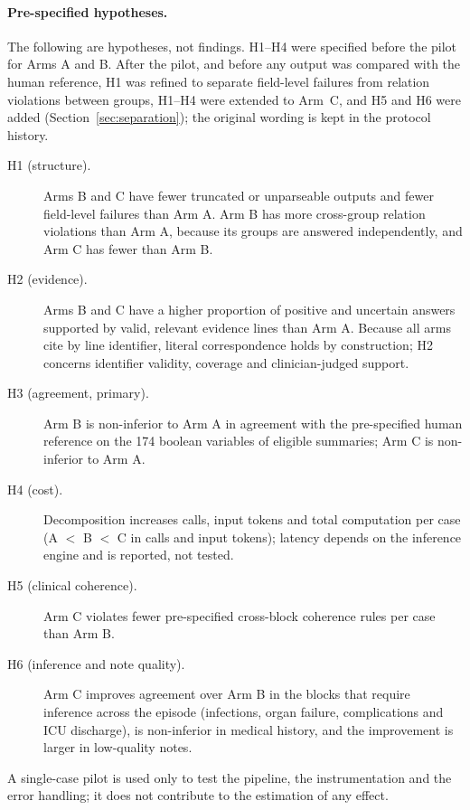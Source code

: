 \paragraph{Pre-specified hypotheses.} The following are hypotheses, not findings. H1--H4 were specified
before the pilot for Arms A and B. After the pilot, and before any output was compared with the human
reference, H1 was refined to separate field-level failures from relation violations between groups, H1--H4
were extended to Arm~C, and H5 and H6 were added (Section~\ref{sec:separation}); the original wording is
kept in the protocol history.
\begin{description}
\item[H1 (structure).] Arms B and C have fewer truncated or unparseable outputs and fewer field-level
failures than Arm A. Arm B has more cross-group relation violations than Arm A, because its groups are
answered independently, and Arm C has fewer than Arm B.
\item[H2 (evidence).] Arms B and C have a higher proportion of positive and uncertain answers supported by
valid, relevant evidence lines than Arm A. Because all arms cite by line identifier, literal correspondence
holds by construction; H2 concerns identifier validity, coverage and clinician-judged support.
\item[H3 (agreement, primary).] Arm B is non-inferior to Arm A in agreement with the pre-specified human
reference on the 174 boolean variables of eligible summaries; Arm C is non-inferior to Arm A.
\item[H4 (cost).] Decomposition increases calls, input tokens and total computation per case (A $<$ B $<$ C
in calls and input tokens); latency depends on the inference engine and is reported, not tested.
\item[H5 (clinical coherence).] Arm C violates fewer pre-specified cross-block coherence rules per case than
Arm B.
\item[H6 (inference and note quality).] Arm C improves agreement over Arm B in the blocks that require
inference across the episode (infections, organ failure, complications and ICU discharge), is non-inferior
in medical history, and the improvement is larger in low-quality notes.
\end{description}
A single-case pilot is used only to test the pipeline, the instrumentation and the error handling;
it does not contribute to the estimation of any effect.

